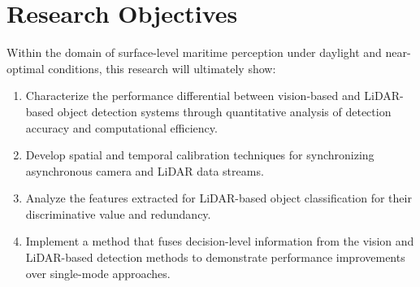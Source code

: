 \section{Research Objectives}
Within the domain of surface-level maritime perception under daylight and near-optimal conditions, this research will ultimately show:
\begin{enumerate}
    \item Characterize the performance differential between vision-based and LiDAR-based object detection systems through quantitative analysis of detection accuracy and computational efficiency.
    \item Develop spatial and temporal calibration techniques for synchronizing asynchronous camera and LiDAR data streams.
    \item Analyze the features extracted for LiDAR-based object classification for their discriminative value and redundancy.
    \item Implement a method that fuses decision-level information from the vision and LiDAR-based detection methods to demonstrate performance improvements over single-mode approaches.
\end{enumerate}



